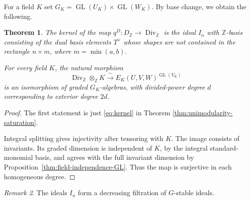 \documentclass[10pt]{amsart}
\newtheorem{theorem}{Theorem}[section]
\theoremstyle{definition}
\theoremstyle{remark}
\newtheorem{remark}[theorem]{Remark}
\newcommand{\Z}{\mathbb Z}
\newcommand{\GL}{\operatorname{GL}}
\newcommand{\Div}{\operatorname{Div}}
\begin{document}
 For a field $K$ set   $G_K=\GL(U_K)\times\GL(W_K)$. By base change, we obtain the following.
\begin{theorem}
\label{thm:Div-base-change-new} The kernel of the map  $q^D:D_\Z\to \Div_{\mathbb Z}$ is the ideal $I_n$  with $\Z$-basis consisting of the dual basis elements $T^\vee$ whose shapes are not contained in the rectangle $n\times m$, where $m=\min(a,b)$.\smallskip


For every   field $K$, the natural morphism
\begin{equation}\label{eq:Div-base-change-new}
\Div_{\mathbb Z}\otimes_{\mathbb Z}K
\xrightarrow{\ \sim\ } E_K(U,V,W)^{\GL(V_K)}
\end{equation}
is an isomorphism of graded $G_K$-algebras, with divided-power degree $d$ corresponding to exterior degree $2d$.
\end{theorem}
\begin{proof} The first statement is just \eqref{eq:kernel} in Theorem  \ref{thm:unimodularity-saturation}.\smallskip


Integral splitting gives injectivity after tensoring with $K$.
The image consists of invariants. Its graded dimension is independent
of $K$, by the integral standard-monomial basis, and agrees with the
full invariant dimension by Proposition~\ref{thm:field-independence-GL}.
Thus the map is surjective in each homogeneous degree.
\end{proof}
\begin{remark}\label{defn}
The ideals $I_n$ form a decreasing filtration of $G$-stable ideals.
\end{remark}
\end{document}
